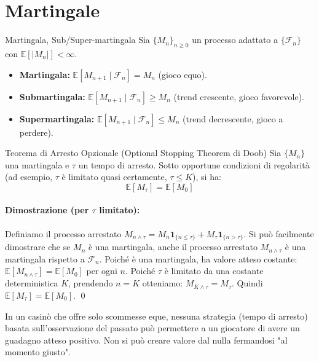 \documentclass[11pt,a4paper]{article}
\begin{document}
\newpage
\section{Martingale}

\begin{definizione}{Martingala, Sub/Super-martingala}{}
Sia $\{M_n\}_{n \ge 0}$ un processo adattato a $\{\mathcal{F}_n\}$ con $\mathbb{E}[|M_n|] < \infty$.
\begin{itemize}
    \item \textbf{Martingala:} $\mathbb{E}[M_{n+1} \mid \mathcal{F}_n] = M_n$ (gioco equo).
    \item \textbf{Submartingala:} $\mathbb{E}[M_{n+1} \mid \mathcal{F}_n] \ge M_n$ (trend crescente, gioco favorevole).
    \item \textbf{Supermartingala:} $\mathbb{E}[M_{n+1} \mid \mathcal{F}_n] \le M_n$ (trend decrescente, gioco a perdere).
\end{itemize}
\end{definizione}

\begin{teorema}{Teorema di Arresto Opzionale (Optional Stopping Theorem di Doob)}{}
Sia $\{M_n\}$ una martingala e $\tau$ un tempo di arresto. Sotto opportune condizioni di regolarità (ad esempio, $\tau$ è limitato quasi certamente, $\tau \le K$), si ha:
\[ \mathbb{E}[M_\tau] = \mathbb{E}[M_0] \]
\end{teorema}
\paragraph{Dimostrazione (per $\tau$ limitato):}
Definiamo il processo arrestato $M_{n \wedge \tau} = M_n \mathbf{1}_{\{n \le \tau\}} + M_\tau \mathbf{1}_{\{n > \tau\}}$.
Si può facilmente dimostrare che se $M_n$ è una martingala, anche il processo arrestato $M_{n \wedge \tau}$ è una martingala rispetto a $\mathcal{F}_n$.
Poiché è una martingala, ha valore atteso costante: $\mathbb{E}[M_{n \wedge \tau}] = \mathbb{E}[M_0]$ per ogni $n$.
Poiché $\tau$ è limitato da una costante deterministica $K$, prendendo $n = K$ otteniamo:
$M_{K \wedge \tau} = M_\tau$. Quindi $\mathbb{E}[M_\tau] = \mathbb{E}[M_0]$.
\qed

\begin{intuizione}
In un casinò che offre solo scommesse eque, nessuna strategia (tempo di arresto) basata sull'osservazione del passato può permettere a un giocatore di avere un guadagno atteso positivo. Non si può creare valore dal nulla fermandosi "al momento giusto".
\end{intuizione}
\end{document}
